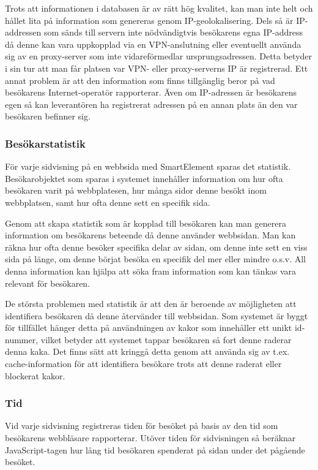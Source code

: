 Trots att informationen i databasen är av rätt hög kvalitet, kan man inte helt och hållet lita på information som genereras genom IP-geolokalisering. Dels så är IP-addressen som sänds till servern inte nödvändigtvis besökarens egna IP-address då denne kan vara uppkopplad via en VPN-anslutning eller eventuellt använda sig av en proxy-server som inte vidareförmedlar ursprungsadressen. Detta betyder i sin tur att man får platsen var VPN- eller proxy-serverns IP är registrerad. Ett annat problem är att den information som finns tillgänglig beror på vad besökarens Internet-operatör rapporterar. Även om IP-adressen är besökarens egen så kan leverantören ha registrerat adressen på en annan plats än den var besökaren befinner sig. 

\subsubsection{Besökarstatistik}

För varje sidvisning på en webbsida med SmartElement sparas det statistik. Besökarobjektet som sparas i systemet innehåller information om hur ofta besökaren varit på webbplatesen, hur många sidor denne besökt inom webbplatsen, samt hur ofta denne sett en specifik sida.

Genom att skapa statistik som är kopplad till besökaren kan man generera information om besökarens beteende då denne använder webbsidan. Man kan räkna hur ofta denne besöker specifika delar av sidan, om denne inte sett en viss sida på länge, om denne börjat besöka en specifik del mer eller mindre o.s.v. All denna information kan hjälpa att söka fram information som kan tänkas vara relevant för besökaren.

De största problemen med statistik är att den är beroende av möjligheten att identifiera besökaren då denne återvänder till webbsidan. Som systemet är byggt för tillfället hänger detta på användningen av kakor som innehåller ett unikt id-nummer, vilket betyder att systemet tappar besökaren så fort denne raderar denna kaka. Det finns sätt att kringgå detta genom att använda sig av t.ex. cache-information för att identifiera besökare trots att denne raderat eller blockerat kakor. \citep{ashkanblog}



\subsubsection{Tid}

Vid varje sidvisning registreras tiden för besöket på basis av den tid som besökarens webbläsare rapporterar. Utöver tiden för sidvisningen så beräknar JavaScript-tagen hur lång tid besökaren spenderat på sidan under det pågående besöket.


